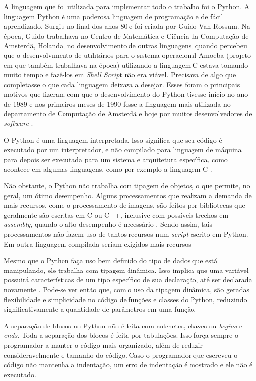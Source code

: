 \documentclass[
	12pt,				%
	twoside,			%
	a4paper,			%
	english,			%
	french,				%
	spanish,			%
	brazil				%
	]{abntex2}
\begin{document}
A linguagem que foi utilizada para implementar todo o trabalho foi o
Python. A linguagem Python é uma poderosa linguagem de programação e de
fácil aprendizado. Surgiu no final dos anos 80 e foi criada por Guido
Van Rossum. Na época, Guido trabalhava no Centro de Matemática e Ciência
da Computação de Amsterdã, Holanda, no desenvolvimento de outras
linguagens, quando percebeu que o desenvolvimento de utilitários para o
sistema operacional Amoeba (projeto em que também trabalhava na época)
utilizando a linguagem C estava tomando muito tempo e fazê-los em
\emph{Shell Scrip}t não era viável. Precisava de algo que completasse o
que cada linguagem deixava a desejar. Esses foram o principais motivos
que fizeram com que o desenvolvimento do Python tivesse início no ano de
1989 e nos primeiros meses de 1990 fosse a linguagem mais utilizada no
departamento de Computação de Amsterdã e hoje por muitos desenvolvedores
de \emph{software} \cite{SILVA}.

O Python é uma linguagem interpretada. Isso significa que seu código é
executado por um interpretador, e não compilado para linguagem de
máquina para depois ser executada para um sistema e arquitetura
específica, como acontece em algumas linguagens, como por exemplo a
linguagem C \cite{MAGNUN}.

Não obstante, o Python não trabalha com tipagem de objetos, o que
permite, no geral, um ótimo desempenho. Alguns processamentos que
realizam a demanda de mais recursos, como o processamento de imagens,
são feitos por bibliotecas que geralmente são escritas em C ou C++,
inclusive com possíveis trechos em \emph{assembly}, quando o alto
desempenho é necessário \cite{GUIDO}. Sendo assim, tais processamentos
não fazem uso de tantos recursos num \emph{script} escrito em Python. Em
outra linguagem compilada seriam exigidos mais recursos.

Mesmo que o Python faça uso bem definido do tipo de dados que está
manipulando, ele trabalha com tipagem dinâmica. Isso implica que uma
variável possuirá características de um tipo específico de sua
declaração, até ser declarada novamente \cite{MAGNUN}. Pode-se ver então
que, com o uso da tipagem dinâmica, são geradas flexibilidade e
simplicidade no código de funções e classes do Python, reduzindo
significativamente a quantidade de parâmetros em uma função.

A separação de blocos no Python não é feita com colchetes, chaves ou
\emph{begins} e \emph{ends}. Toda a separação dos blocos é feita por
tabulações. Isso força sempre o programador a manter o código mais
organizado, além de reduzir consideravelmente o tamanho do código. Caso
o programador que escreveu o código não mantenha a indentação, um erro
de indentação é mostrado e ele não é executado.
\end{document}
